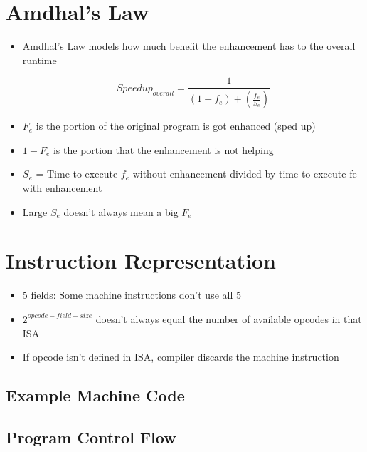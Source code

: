 \documentclass{article}
\begin{document}
\section{Amdhal's Law}

\begin{itemize}
    \item Amdhal's Law models how much benefit the enhancement has to the overall runtime
    
    \begin{equation}
        Speedup_{overall}=\frac{1}{(1-f_e) + (\frac{f_e}{S_e})}
    \end{equation}
    
    \item $F_e$ is the portion of the original program is got enhanced (sped up) 
    
    \item $1 - F_e$ is the portion that the enhancement is not helping
    
    \item $S_e$ = Time to execute $f_e$ without enhancement divided by time to execute fe with enhancement
    
    \item Large $S_e$ doesn't always mean a big $F_e$
    \end{itemize}

\section{Instruction Representation}
    
    \begin{itemize}
        \item 5 fields: Some machine instructions don't use all 5
        
        
        \item $2^{opcode-field-size}$ doesn't always equal the number of available opcodes in that ISA
        
        \item If opcode isn't defined in ISA, compiler discards the machine instruction
        
    \end{itemize}
    
    \subsection{Example Machine Code}
    

    \subsection{Program Control Flow}
    
\end{document}
